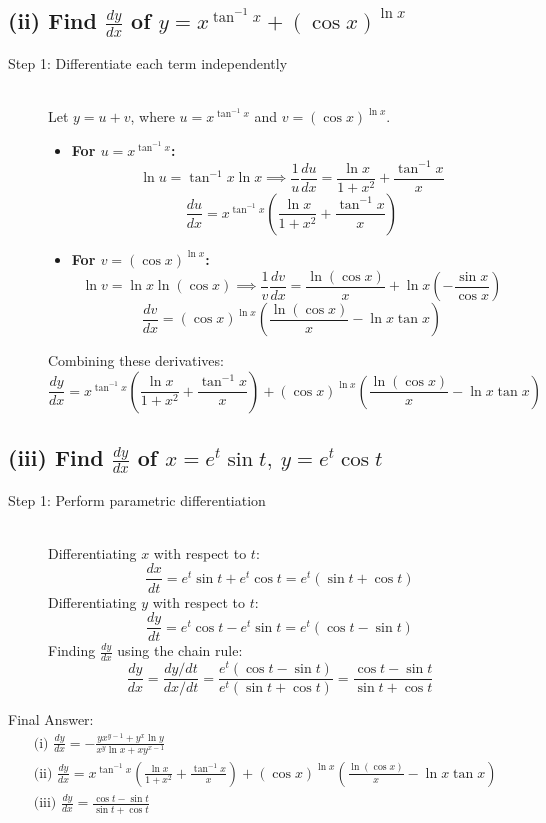 \documentclass[11pt, a4paper]{article}
\begin{document}
\subsection*{(ii) Find $\frac{dy}{dx}$ of $y = x^{\tan^{-1}x} + (\cos x)^{\ln x}$}
\begin{description}
    \item[Step 1: Differentiate each term independently] \ \\
    Let $y = u + v$, where $u = x^{\tan^{-1}x}$ and $v = (\cos x)^{\ln x}$.
    \begin{itemize}
        \item \textbf{For $u = x^{\tan^{-1}x}$:}
        \[ \ln u = \tan^{-1}x \ln x \implies \frac{1}{u}\frac{du}{dx} = \frac{\ln x}{1+x^2} + \frac{\tan^{-1}x}{x} \]
        \[ \frac{du}{dx} = x^{\tan^{-1}x} \left( \frac{\ln x}{1+x^2} + \frac{\tan^{-1}x}{x} \right) \]
        \item \textbf{For $v = (\cos x)^{\ln x}$:}
        \[ \ln v = \ln x \ln(\cos x) \implies \frac{1}{v}\frac{dv}{dx} = \frac{\ln(\cos x)}{x} + \ln x \left( -\frac{\sin x}{\cos x} \right) \]
        \[ \frac{dv}{dx} = (\cos x)^{\ln x} \left( \frac{\ln(\cos x)}{x} - \ln x \tan x \right) \]
    \end{itemize}
    Combining these derivatives:
    \[ \frac{dy}{dx} = x^{\tan^{-1}x} \left( \frac{\ln x}{1+x^2} + \frac{\tan^{-1}x}{x} \right) + (\cos x)^{\ln x} \left( \frac{\ln(\cos x)}{x} - \ln x \tan x \right) \]
\end{description}

\subsection*{(iii) Find $\frac{dy}{dx}$ of $x = e^t \sin t, \ y = e^t \cos t$}
\begin{description}
    \item[Step 1: Perform parametric differentiation] \ \\
    Differentiating $x$ with respect to $t$:
    \[ \frac{dx}{dt} = e^t \sin t + e^t \cos t = e^t(\sin t + \cos t) \]
    Differentiating $y$ with respect to $t$:
    \[ \frac{dy}{dt} = e^t \cos t - e^t \sin t = e^t(\cos t - \sin t) \]
    Finding $\frac{dy}{dx}$ using the chain rule:
    \[ \frac{dy}{dx} = \frac{dy/dt}{dx/dt} = \frac{e^t(\cos t - \sin t)}{e^t(\sin t + \cos t)} = \frac{\cos t - \sin t}{\sin t + \cos t} \]
\end{description}

Final Answer:
\[ 
\boxed{
\begin{aligned}
&\text{(i) } \frac{dy}{dx} = -\frac{y x^{y-1} + y^x \ln y}{x^y \ln x + x y^{x-1}} \\
&\text{(ii) } \frac{dy}{dx} = x^{\tan^{-1}x} \left( \frac{\ln x}{1+x^2} + \frac{\tan^{-1}x}{x} \right) + (\cos x)^{\ln x} \left( \frac{\ln(\cos x)}{x} - \ln x \tan x \right) \\
&\text{(iii) } \frac{dy}{dx} = \frac{\cos t - \sin t}{\sin t + \cos t}
\end{aligned}
} 
\]
\end{document}
